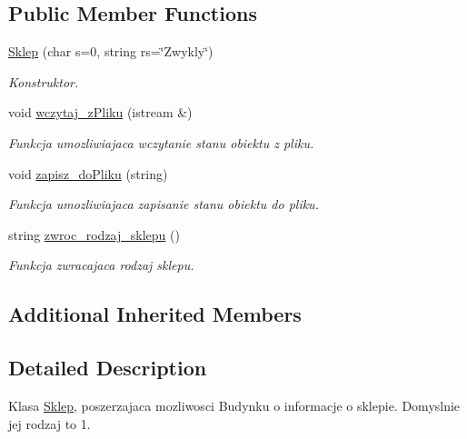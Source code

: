 \subsection*{Public Member Functions}
\begin{DoxyCompactItemize}
\item 
\hypertarget{class_sklep_af38b90089cdb38d64032bb188a8cf1d5}{}\hyperlink{class_sklep_af38b90089cdb38d64032bb188a8cf1d5}{Sklep} (char s=0, string rs=\char`\"{}Zwykly\char`\"{})\label{class_sklep_af38b90089cdb38d64032bb188a8cf1d5}

\begin{DoxyCompactList}\small\item\em Konstruktor. \end{DoxyCompactList}\item 
\hypertarget{class_sklep_a37ceeb8a28621956abd723c138d8f959}{}void \hyperlink{class_sklep_a37ceeb8a28621956abd723c138d8f959}{wczytaj\+\_\+z\+Pliku} (istream \&)\label{class_sklep_a37ceeb8a28621956abd723c138d8f959}

\begin{DoxyCompactList}\small\item\em Funkcja umozliwiajaca wczytanie stanu obiektu z pliku. \end{DoxyCompactList}\item 
\hypertarget{class_sklep_a5cec36bf246569297492661ef183baa0}{}void \hyperlink{class_sklep_a5cec36bf246569297492661ef183baa0}{zapisz\+\_\+do\+Pliku} (string)\label{class_sklep_a5cec36bf246569297492661ef183baa0}

\begin{DoxyCompactList}\small\item\em Funkcja umozliwiajaca zapisanie stanu obiektu do pliku. \end{DoxyCompactList}\item 
string \hyperlink{class_sklep_a70447391a0f4d141ee24af47ac1939f7}{zwroc\+\_\+rodzaj\+\_\+sklepu} ()
\begin{DoxyCompactList}\small\item\em Funkcja zwracajaca rodzaj sklepu. \end{DoxyCompactList}\end{DoxyCompactItemize}
\subsection*{Additional Inherited Members}


\subsection{Detailed Description}
Klasa \hyperlink{class_sklep}{Sklep}, poszerzajaca mozliwosci Budynku o informacje o sklepie. Domyslnie jej rodzaj to 1. 

